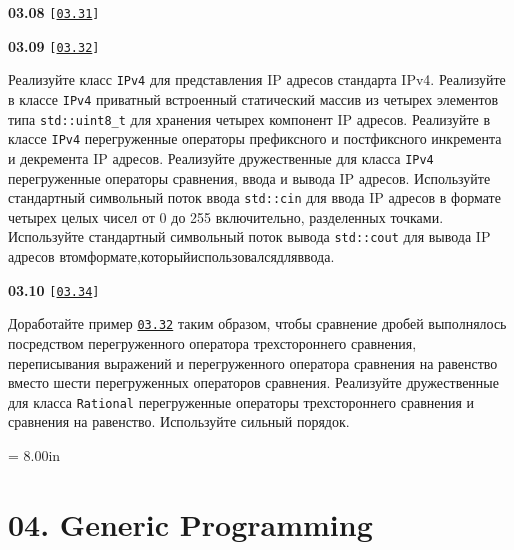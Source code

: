 \documentclass[a4paper,12pt]{article}
\begin{document}
\bigskip

{\large \textbf{03.08} \texttt{[\href{https://github.com/i-s-m-mipt/Education/blob/master/projects/examples/source/03.31.cpp}{\texttt{03.31}}]}}

\bigskip

\bigskip

{\large \textbf{03.09} \texttt{[\href{https://github.com/i-s-m-mipt/Education/blob/master/projects/examples/source/03.32.cpp}{\texttt{03.32}}]}}

\bigskip

Реализуйте класс \lstinline{IPv4} для представления IP адресов стандарта IPv4. Реализуйте в классе \lstinline{IPv4} приватный встроенный статический массив из четырех элементов типа \lstinline{std::uint8_t} для хранения четырех компонент IP адресов. Реализуйте в классе \lstinline{IPv4} перегруженные операторы префиксного и постфиксного инкремента и декремента IP адресов. Реализуйте дружественные для класса \lstinline{IPv4} перегруженные операторы сравнения, ввода и вывода IP адресов. Используйте стандартный символьный поток ввода \lstinline{std::cin} для ввода IP адресов в формате четырех целых чисел от 0 до 255 включительно, разделенных точками. Используйте стандартный символьный поток вывода \lstinline{std::cout} для вывода IP адресов в\:том\:формате,\:который\:использовался\:для\:ввода.

\bigskip

{\large \textbf{03.10} \texttt{[\href{https://github.com/i-s-m-mipt/Education/blob/master/projects/examples/source/03.34.cpp}{\texttt{03.34}}]}}

\bigskip

Доработайте пример \href{https://github.com/i-s-m-mipt/Education/blob/master/projects/examples/source/03.32.cpp}{\texttt{03.32}} таким образом, чтобы сравнение дробей выполнялось посредством перегруженного оператора трехстороннего сравнения, переписывания выражений и перегруженного оператора сравнения на равенство вместо шести перегруженных операторов сравнения. Реализуйте дружественные для класса \lstinline{Rational} перегруженные операторы трехстороннего сравнения и сравнения на равенство. Используйте сильный порядок.



\newpage\thispagestyle{empty}\pdfpageheight = 8.00in\enlargethispage{100in}

\section{04. Generic Programming}
\end{document}
